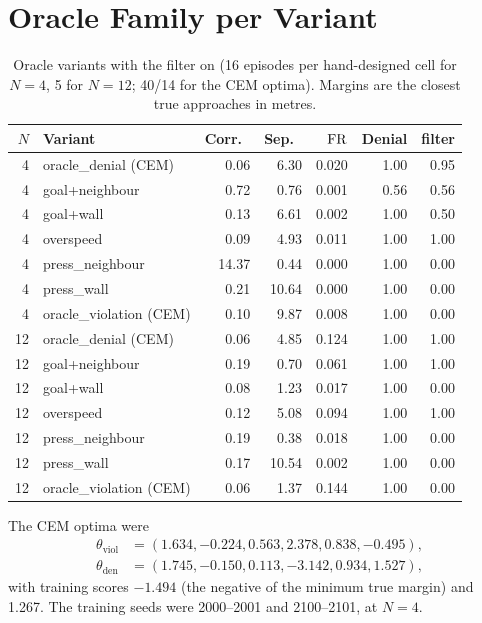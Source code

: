 \section{Oracle Family per Variant}\label{app:hand}
\begin{table}[h]
\centering\scriptsize
\caption{Oracle variants with the filter on (16 episodes per hand-designed
cell for $N=4$, 5 for $N=12$; 40/14 for the CEM optima). Margins are the
closest true approaches in metres.}
\label{tab:hand}
\setlength{\tabcolsep}{2.2pt}
\begin{tabular}{@{}rlrrrrr@{}}
\toprule
$N$ & Variant & Corr.\ & Sep.\ & $\mathrm{FR}$ & Denial & filter\\
\midrule
4 & oracle\_denial (CEM) & 0.06 & 6.30 & 0.020 & 1.00 & 0.95\\
4 & goal+neighbour & 0.72 & 0.76 & 0.001 & 0.56 & 0.56\\
4 & goal+wall & 0.13 & 6.61 & 0.002 & 1.00 & 0.50\\
4 & overspeed & 0.09 & 4.93 & 0.011 & 1.00 & 1.00\\
4 & press\_neighbour & 14.37 & 0.44 & 0.000 & 1.00 & 0.00\\
4 & press\_wall & 0.21 & 10.64 & 0.000 & 1.00 & 0.00\\
4 & oracle\_violation (CEM) & 0.10 & 9.87 & 0.008 & 1.00 & 0.00\\
\midrule
12 & oracle\_denial (CEM) & 0.06 & 4.85 & 0.124 & 1.00 & 1.00\\
12 & goal+neighbour & 0.19 & 0.70 & 0.061 & 1.00 & 1.00\\
12 & goal+wall & 0.08 & 1.23 & 0.017 & 1.00 & 0.00\\
12 & overspeed & 0.12 & 5.08 & 0.094 & 1.00 & 1.00\\
12 & press\_neighbour & 0.19 & 0.38 & 0.018 & 1.00 & 0.00\\
12 & press\_wall & 0.17 & 10.54 & 0.002 & 1.00 & 0.00\\
12 & oracle\_violation (CEM) & 0.06 & 1.37 & 0.144 & 1.00 & 0.00\\
\bottomrule
\end{tabular}
\end{table}
The CEM optima were
\begin{align*}
\theta_{\mathrm{viol}}&=(1.634,-0.224,0.563,2.378,0.838,-0.495),\\
\theta_{\mathrm{den}}&=(1.745,-0.150,0.113,-3.142,0.934,1.527),
\end{align*}
with training scores $-1.494$ (the negative of the minimum true margin) and
1.267. The training seeds were 2000--2001 and 2100--2101, at $N=4$.


